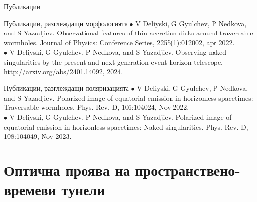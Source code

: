 \documentclass[hyperref={colorlinks,citecolor=blue,linkcolor=blue,urlcolor=blue}]{beamer}
\begin{document}
	\begin{frame}{Публикации}
		
		\begin{block}{Публикации, разглеждащи морфологията}
			$\bullet$ V Deliyski, G Gyulchev, P Nedkova, and S Yazadjiev. Observational features
			of thin accretion disks around traversable wormholes. Journal of Physics:
			Conference Series, 2255(1):012002, apr 2022.\\
			$\bullet$ V Deliyski, G Gyulchev, P Nedkova, and S Yazadjiev.
			Observing naked singularities by the present and next-generation event horizon
			telescope. http://arxiv.org/abs/2401.14092, 2024.
		\end{block}
		
		\begin{block}{Публикации, разглеждащи поляризацията}
			$\bullet$ V Deliyski, G Gyulchev, P Nedkova, and S Yazadjiev.
			Polarized image of equatorial emission in horizonless spacetimes: Traversable
			wormholes. Phys. Rev. D, 106:104024, Nov 2022.\\
			$\bullet$ V Deliyski, G Gyulchev, P Nedkova, and S Yazadjiev.
			Polarized image of equatorial emission in horizonless spacetimes: Naked
			singularities. Phys. Rev. D, 108:104049, Nov 2023.
		\end{block}
		
	\end{frame}
	
	\section{Оптична проява на пространствено-времеви тунели}
	
\end{document}
